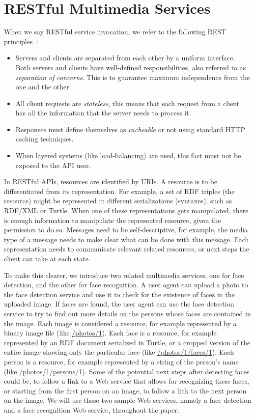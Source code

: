\documentclass[runningheads,a4paper, twocolumn]{llncs}
\begin{document}
\section{RESTful Multimedia Services} \label{sec:restful-multimedia-services}
\label{RESTfulServices}
When we say RESTful service invocation, we refer to the following REST principles~\cite{FieldingREST}:
\begin{itemize}
\item Servers and clients are separated from each other by a uniform interface. Both servers and clients have well-defined responsibilities, also referred to as \emph{separation of concerns}. This is to guarantee maximum independence from the one and the other.
\item All client requests are \emph{stateless}, this means that each request from a client has all the information that the server needs to process it.
\item Responses must define themselves as \emph{cacheable} or not using standard HTTP caching techniques.
\item When layered systems (like load-balancing) are used, this fact must not be exposed to the API user.
\end{itemize}

In RESTful APIs, resources are identified by URIs. A resource is to be differentiated from its representation. For example, a set of RDF triples (the resource) might be represented in different serializations (syntaxes), such as RDF/XML or Turtle. When one of these representations gets manipulated, there is enough information to manipulate the represented resource, given the permission to do so. Messages need to be self-descriptive, for example, the media type of a message needs to make clear what can be done with this message. Each representation needs to communicate relevant related resources, or next steps the client can take at each state.

To make this clearer, we introduce two related multimedia services, one for face detection, and the other for face recognition. A user agent can upload a photo to the face detection service and use it to check for the existence of faces in the uploaded image. If faces are found, the user agent can use the face detection service to try to find out more details on the persons whose faces are contained in the image. Each image is considered a resource, for example represented by a binary image file (like \url{/photos/1}). Each face is a resource, for example represented by an RDF document serialized in Turtle, or a cropped version of the entire image showing only the particular face (like \url{/photos/1/faces/1}). Each person is a resource, for example represented by a string of the person's name (like \url{/photos/1/persons/1}). Some of the potential next steps after detecting faces could be, to follow a link to a Web service that allows for recognizing these faces, or starting from the first person on an image, to follow a link to the next person on the image. We will use these two sample Web services, namely a face detection and a face recognition Web service, throughout the paper.
\end{document}
